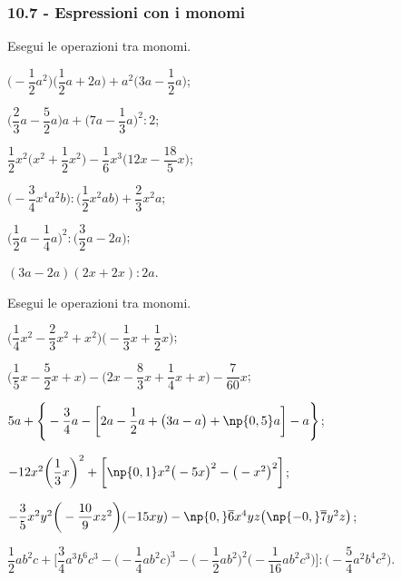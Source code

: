 \subsubsection*{10.7 - Espressioni con i monomi}
\begin{esercizio}[\Ast]
 \label{ese:10.32} %
Esegui le operazioni tra monomi.
\begin{multicols}{2}
\begin{enumeratea}
 \item $\bigg(-\dfrac{1}{2}a^{2}\bigg)\bigg(\dfrac{1}{2}a+2a\bigg)+a^{2}\bigg(3a-\dfrac{1}{2}a\bigg)$;
 \item $\bigg(\dfrac{2}{3}a-\dfrac{5}{2}a\bigg)a+\bigg(7a-\dfrac{1}{3}a\bigg)^{2}:2$;
 \item $\dfrac{1}{2}x^{2}\bigg(x^{2}+\dfrac{1}{2}x^{2}\bigg)-\dfrac{1}{6}x^{3}\bigg(12x-\dfrac{18}{5}x\bigg)$;
 \item $\bigg(-{\dfrac{3}{4}}x^{4}a^{2}b\bigg):\bigg(\dfrac{1}{2}x^{2}ab\bigg)+\dfrac{2}{3}x^{2}a$;
 \item $\bigg(\dfrac{1}{2}a-\dfrac{1}{4}a\bigg)^{2}:\bigg(\dfrac{3}{2}a-2a\bigg)$;
 \item $(3a-2a)(2x+2x):2a$.
\end{enumeratea}
\end{multicols}
\end{esercizio}

\begin{esercizio}[\Ast]
 \label{ese:10.33} %
Esegui le operazioni tra monomi.

\begin{enumeratea}
 \item $\bigg(\dfrac{1}{4}x^{2}-\dfrac{2}{3}x^{2}+x^{2}\bigg)\bigg(-{\dfrac{1}{3}}x+\dfrac{1}{2}x\bigg)$;
 \item $\bigg(\dfrac{1}{5}x-\dfrac{5}{2}x+x\bigg)-\bigg(2x-\dfrac{8}{3}x+\dfrac{1}{4}x+x\bigg)-\dfrac{7}{60}x$;
 \item $5a+\Bigg\{-{\dfrac{3}{4}}a-\bigg[2a-\dfrac{1}{2}a+\big(3a-a\big)+\np{0,5}a\bigg]-a\Bigg\}$;
 \item $-12x^{2}\bigg(\dfrac{1}{3}x\bigg)^{2}+\bigg[\np{0,1}x^{2}\big(-5x\big)^{2}-\big(-x^{2}\big)^{2}\bigg]$;
 \item $-{\dfrac{3}{5}}x^{2}y^{2}\bigg(-{\dfrac{10}{9}}xz^{2}\bigg)(-15xy)-\np{0,}\overline{{6}}x^{4}yz\big(\np{-0,}\overline{{7}}y^{2}z\big)$;
 \item $\dfrac{1}{2}ab^{2}c+\Bigg[\dfrac{3}{4}a^{3}b^{6}c^{3}-\bigg(-{\dfrac{1}{4}ab^{2}c}\bigg)^{3}-\bigg(-{\dfrac{1}{2}ab^{2}}\bigg)^{2}\bigg(-{\dfrac{1}{16}ab^{2}c^{3}}\bigg)\Bigg]:%
 \bigg(-{\dfrac{5}{4}a^{2}b^{4}c^{2}}\bigg)$.
\end{enumeratea}
\end{esercizio}

